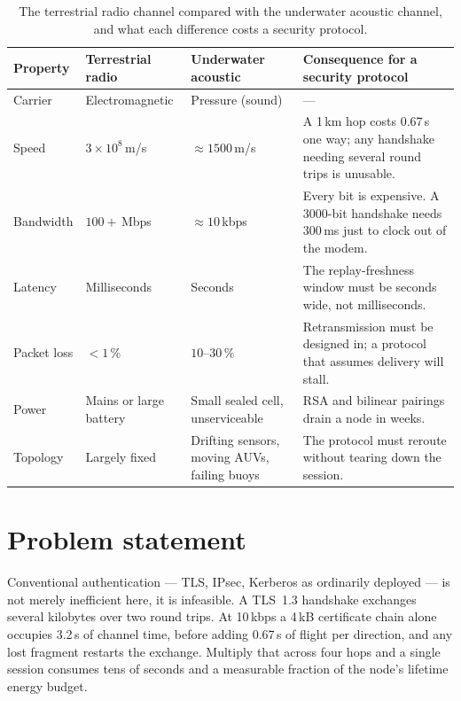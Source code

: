\begin{table}[H]
\centering
\caption[Terrestrial versus underwater acoustic channels]%
{The terrestrial radio channel compared with the underwater acoustic channel, and what each
difference costs a security protocol.}
\label{tab:terr-vs-uw}
\small
\begin{tabularx}{\textwidth}{@{}L{28mm} L{30mm} L{30mm} X@{}}
\toprule
\textbf{Property} & \textbf{Terrestrial radio} & \textbf{Underwater acoustic} &
\textbf{Consequence for a security protocol}\\
\midrule
Carrier & Electromagnetic & Pressure (sound) & --- \\
Speed & $3\times10^{8}$\,m/s & $\approx 1500$\,m/s & A 1\,km hop costs 0.67\,s one way; any
handshake needing several round trips is unusable.\\
Bandwidth & $100+$\,Mbps & $\approx 10$\,kbps & Every bit is expensive. A 3000-bit handshake
needs 300\,ms just to clock out of the modem.\\
Latency & Milliseconds & Seconds & The replay-freshness window must be seconds wide, not
milliseconds.\\
Packet loss & $<1\,\%$ & $10$--$30\,\%$ & Retransmission must be designed in; a protocol
that assumes delivery will stall.\\
Power & Mains or large battery & Small sealed cell, unserviceable & RSA and bilinear
pairings drain a node in weeks.\\
Topology & Largely fixed & Drifting sensors, moving AUVs, failing buoys & The protocol must
reroute without tearing down the session.\\
\bottomrule
\end{tabularx}
\end{table}

\section{Problem statement}

Conventional authentication --- TLS, IPsec, Kerberos as ordinarily deployed --- is not
merely inefficient here, it is infeasible. A TLS~1.3 handshake exchanges several kilobytes
over two round trips. At 10\,kbps a 4\,kB certificate chain alone occupies 3.2\,s of channel
time, before adding 0.67\,s of flight per direction, and any lost fragment restarts the
exchange. Multiply that across four hops and a single session consumes tens of seconds and
a measurable fraction of the node's lifetime energy budget.


